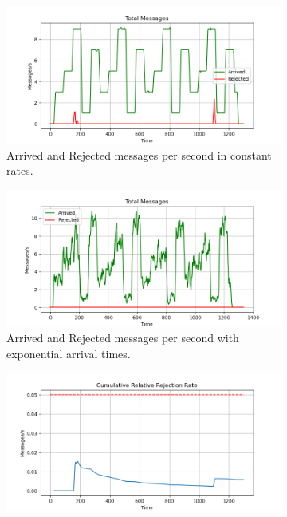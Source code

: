 \begin{figure}[H]
	\begin{subfigure}{0.49\linewidth}
	    \centering
	    \includegraphics[width=1\linewidth]{images/default/constant/messages.png}
	    \caption{Arrived and Rejected messages per second in constant rates.}
	    \label{fig:default_constant_messages}
	\end{subfigure}
	\begin{subfigure}{0.49\linewidth}
	    \centering
    		\includegraphics[width=1\linewidth]{images/default/exponential/messages.png}
	    \caption{Arrived and Rejected messages per second with exponential arrival times.}
    		\label{fig:default_exponential_messages}
	\end{subfigure}
	\begin{subfigure}{0.49\linewidth}
	    \centering
	    \includegraphics[width=1\linewidth]{images/default/constant/rejection_cumulative.png}

\end{subfigure}
\end{figure}
